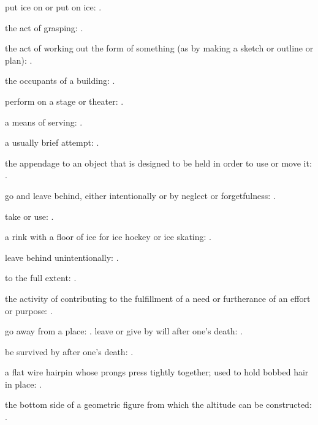   put ice on or put on ice: .

  the act of grasping:   .

  the act of working out the form of something (as by making a sketch or outline or plan):   .

  the occupants of a building: .

  perform on a stage or theater:   .

  a means of serving:   .

  a usually brief attempt:   .

  the appendage to an object that is designed to be held in order to use or move it:   .

  go and leave behind, either intentionally or by neglect or forgetfulness: .

  take or use:   .

  a rink with a floor of ice for ice hockey or ice skating:   .

  leave behind unintentionally:   .

  to the full extent: .

  the activity of contributing to the fulfillment of a need or furtherance of an effort or purpose:   .

  go away from a place:   . leave or give by will after one's death:   .

  be survived by after one's death:   .

  a flat wire hairpin whose prongs press tightly together; used to hold bobbed hair in place:   .

  the bottom side of a geometric figure from which the altitude can be constructed: .

